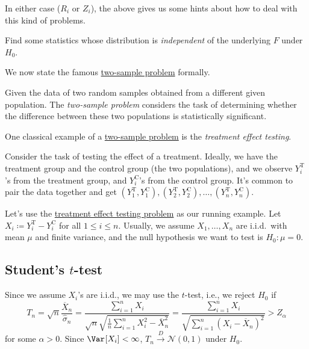 In either case (\(R_i\) or \(Z_i\)), the above gives us some hints about how to deal with this kind of problems.

\begin{intuition}
	Find some statistics whose distribution is \emph{independent} of the underlying \(F\) under \(H_0\).
\end{intuition}

We now state the famous \hyperref[prb:two-sample]{two-sample problem} formally.

\begin{problem}\label{prb:two-sample}
Given the data of two random samples obtained from a different given population. The \emph{two-sample problem} considers the task of determining whether the difference between these two populations is statistically significant.
\end{problem}

One classical example of a \hyperref[prb:two-sample]{two-sample problem} is the \emph{treatment effect testing}.

\begin{eg}\label{eg:treatment-effect}
	Consider the task of testing the effect of a treatment. Ideally, we have the treatment group and the control group (the two populations), and we observe \(Y_i^{\text{T} }\)'s from the treatment group, and \(Y_i^{\text{C} }\)'s from the control group. It's common to pair the data together and get \((Y_1^{\text{T} }, Y_1^{\text{C} }), (Y_2^{\text{T} }, Y_2^{\text{C} }), \dots , (Y_n^{\text{T} }, Y_n^{\text{C} })\).
\end{eg}

Let's use the \hyperref[eg:treatment-effect]{treatment effect testing problem} as our running example. Let \(X_i \coloneqq Y_i^{\text{T} } - Y_i^{\text{C} }\) for all \(1 \leq i \leq n\). Usually, we assume \(X_1 , \dots , X_n\) are i.i.d.\ with mean \(\mu \) and finite variance, and the null hypothesis we want to test is \(H_0 \colon \mu = 0\).

\subsection{Student's \(t\)-test}
Since we assume \(X_i\)'s are i.i.d., we may use the \(t\)-test, i.e., we reject \(H_0\) if
\[
	T_n
	= \sqrt{n} \frac{\overline{X} _n}{\hat{\sigma} _n}
	= \frac{\sum_{i=1}^{n} X_i}{\sqrt{n} \sqrt{\frac{1}{n} \sum_{i=1}^{n} X_i^2 - \overline{X} _n^2} }
	= \frac{\sum_{i=1}^{n} X_i}{\sqrt{\sum_{i=1}^{n} (X_i - \overline{X} _n)^2} }
	> Z_{\alpha }
\]
for some \(\alpha > 0\). Since \(\Var_{}[X_i] < \infty \), \(T_n \overset{D}{\to} \mathcal{N} (0, 1)\) under \(H_0\).

